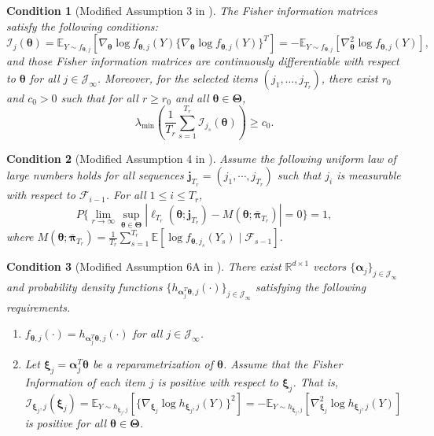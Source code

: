 \documentclass[12pt]{article}
\newcommand{\bfTheta}{\boldsymbol{\Theta}}
\newcommand{\bfalpha}{\boldsymbol{\alpha}}
\newcommand{\bfpi}{\boldsymbol{\pi}}
\newcommand{\bftheta}{\boldsymbol{\theta}}
\newcommand{\bfxi}{\boldsymbol{\xi}}
\newtheorem{condition}{Condition}[section]
\begin{document}
\begin{condition}[Modified Assumption 3 in ] \label{c:c3'}
The Fisher information matrices satisfy the following conditions:
\begin{equation*}
\mathcal{I}_j(\bftheta) 
= \mathbb{E}_{Y \sim f_{\bftheta, j}} [ \nabla_{\bftheta} \log f_{\bftheta, j}(Y) \{ \nabla_{\bftheta} \log f_{\bftheta, j}(Y)\}^T ] 
= - \mathbb{E}_{Y \sim f_{\bftheta, j}} [\nabla_{\bftheta}^2 \log f_{\bftheta, j}(Y)],
\end{equation*}
and those Fisher information matrices are continuously differentiable with respect to $\bftheta$ for all $j \in \mathcal{J}_{\infty}$. Moreover, for the selected items $(j_1,\dots,j_{T_r})$, there exist $r_0$ and $c_0 > 0$ such that for all $r \ge r_0$ and all $\bftheta \in \bfTheta$,
\begin{equation*}
\lambda_{\min}\!\left(\frac{1}{T_r}\sum_{s=1}^{T_r} \mathcal{I}_{j_s}(\bftheta)\right)\ge c_0.
\end{equation*}
\end{condition}

\begin{condition}[Modified Assumption 4 in ] \label{c:c4'}
Assume the following uniform law of large numbers holds for all sequences $\mathbf{j}_{T_r} = (j_1,\cdots,j_{T_r})$ such that $j_i$ is measurable with respect to $\mathcal{F}_{i-1}$. For all $1 \leq i \leq T_r$,
\begin{equation*}
P \Big\{ \lim_{r \to \infty} \sup_{\bftheta \in \bfTheta} | \ell_{T_r}(\bftheta ; \mathbf{j}_{T_r}) - M(\bftheta ; \bar{\bfpi}_{T_r})| = 0  \Big\} = 1,
\end{equation*}
where $M(\bftheta; \bar{\bfpi}_{T_r}) = \frac{1}{T_r} \sum_{s=1}^{T_r} \mathbb{E}[ \log f_{\bftheta, j_s} (Y_s) \mid \mathcal{F}_{s-1}]$.
\end{condition}

\begin{condition}[Modified Assumption 6A in ] \label{c:c6a'}
There exist $\mathbb{R}^{d \times 1}$ vectors $\{\bfalpha_j\}_{j \in \mathcal{J}_{\infty}}$ and probability density functions $\{h_{\bfalpha_j^T \bftheta, j}(\cdot)\}_{j \in \mathcal{J}_{\infty}}$ satisfying the following requirements.
\begin{enumerate}
\item{$f_{\bftheta, j}(\cdot) = h_{\bfalpha_j^T \bftheta, j}(\cdot)$ for all $j \in \mathcal{J}_{\infty}$.}
\item{Let $\bfxi_j = \bfalpha_j^T \bftheta$ be a reparametrization of $\bftheta$. Assume that the Fisher Information of each item $j$ is positive with respect to $\bfxi_j$. That is, 
\begin{equation*}
\mathcal{I}_{\bfxi_j, j}(\bfxi_j) 
= \mathbb{E}_{Y \sim h_{\bfxi_j, j}}[ \{ \nabla_{\bfxi_j} \log h_{\bfxi_j, j}(Y) \}^2]
= -\mathbb{E}_{Y \sim h_{\bfxi_j, j}} [\nabla_{\bfxi_j}^2 \log h_{\bfxi_j, j}(Y)]
\end{equation*}
is positive for all $\bftheta \in \bfTheta$.}
\end{enumerate}
\end{condition}
\end{document}
